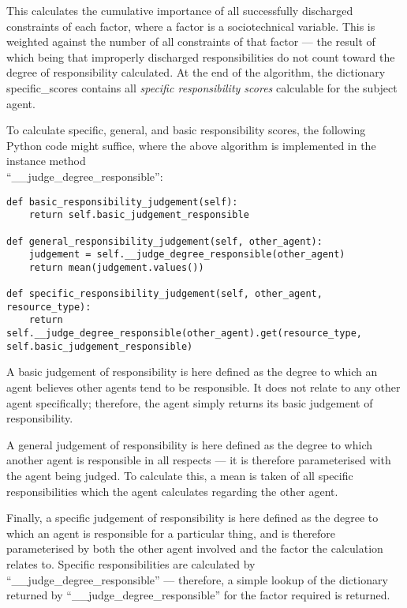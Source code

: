 This calculates the cumulative importance of all successfully discharged constraints of each factor, where a factor is a sociotechnical variable. This is weighted against the number of all constraints of that factor --- the result of which being that improperly discharged responsibilities do not count toward the degree of responsibility calculated. At the end of the algorithm, the dictionary specific\_scores contains all \emph{specific responsibility scores} calculable for the subject agent.\par

To calculate specific, general, and basic responsibility scores, the following Python code might suffice, where the above algorithm is implemented in the instance method\\``\_\_judge\_degree\_responsible'':

\begin{lstlisting}
def basic_responsibility_judgement(self):
    return self.basic_judgement_responsible

def general_responsibility_judgement(self, other_agent):
    judgement = self.__judge_degree_responsible(other_agent)
    return mean(judgement.values())

def specific_responsibility_judgement(self, other_agent, resource_type):
    return self.__judge_degree_responsible(other_agent).get(resource_type, self.basic_judgement_responsible)
\end{lstlisting}

A basic judgement of responsibility is here defined as the degree to which an agent believes other agents tend to be responsible. It does not relate to any other agent specifically; therefore, the agent simply returns its basic judgement of responsibility.\par

A general judgement of responsibility is here defined as the degree to which another agent is responsible in all respects --- it is therefore parameterised with the agent being judged. To calculate this, a mean is taken of all specific responsibilities which the agent calculates regarding the other agent.\par

Finally, a specific judgement of responsibility is here defined as the degree to which an agent is responsible for a particular thing, and is therefore parameterised by both the other agent involved and the factor the calculation relates to. Specific responsibilities are calculated by\\``\_\_judge\_degree\_responsible'' --- therefore, a simple lookup of the dictionary returned by ``\_\_judge\_degree\_responsible'' for the factor required is returned.

